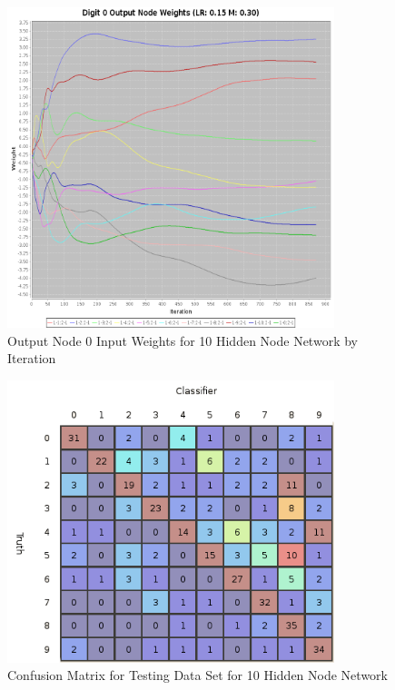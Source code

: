 \documentclass{article}
\begin{document}
\begin{figure}
\centering
\includegraphics[width=0.85\textwidth]{data/final/10_hidden_nodes.png}
\caption{Output Node 0 Input Weights for 10 Hidden Node Network by Iteration}
\label{weight10}
\end{figure}

\begin{figure}
\centering
\includegraphics[width=0.85\textwidth]{data/final/10_test_confusion.png}
\caption{Confusion Matrix for Testing Data Set for 10 Hidden Node Network}
\label{testconfusion10}
\end{figure}
\end{document}
